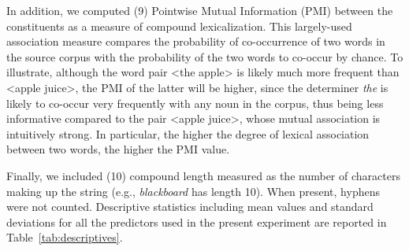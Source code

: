 In addition, we computed (9) Pointwise Mutual Information (PMI) between the constituents as a measure of compound lexicalization. This largely-used association measure \citep{church1990} compares the probability of co-occurrence of two words in the source corpus with the probability of the two words to co-occur by chance. To illustrate, although the word pair <the apple> is likely much more frequent than <apple juice>, the PMI of the latter will be higher, since the determiner \emph{the} is likely to co-occur very frequently with any noun in the corpus, thus being less informative compared to the pair <apple juice>, whose mutual association is intuitively strong. In particular, the higher the degree of lexical association between two words, the higher the PMI value.

Finally, we included (10) compound length measured as the number of characters making up the string (e.g., \emph{blackboard} has length 10). When present, hyphens were not counted. Descriptive statistics including mean values and standard deviations for all the predictors used in the present experiment are reported in Table~\ref{tab:descriptives}.

